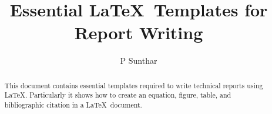 \documentclass[seminar,twoside]{iitbreport}
\begin{document}
\title{Essential \LaTeX\ Templates for Report Writing}
\author{P Sunthar}

\makecoverpage

\begin{abstract}
This document contains essential templates required to write technical
reports using \LaTeX.  Particularly it shows how to create an
equation, figure, table, and bibliographic citation in a \LaTeX\
document.
\end{abstract}

\tableofcontents

\listoftables
\listoffigures

\cleardoublepage
\setcounter{page}{1}






%


\end{document}
